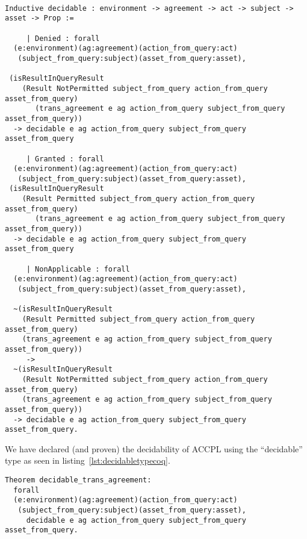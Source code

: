 \begin{lstlisting}

Inductive decidable : environment -> agreement -> act -> subject -> asset -> Prop :=

     | Denied : forall
  (e:environment)(ag:agreement)(action_from_query:act)
   (subject_from_query:subject)(asset_from_query:asset), 

 (isResultInQueryResult 
    (Result NotPermitted subject_from_query action_from_query asset_from_query)
       (trans_agreement e ag action_from_query subject_from_query asset_from_query)) 
  -> decidable e ag action_from_query subject_from_query asset_from_query

     | Granted : forall
  (e:environment)(ag:agreement)(action_from_query:act)
   (subject_from_query:subject)(asset_from_query:asset), 
 (isResultInQueryResult 
    (Result Permitted subject_from_query action_from_query asset_from_query)
       (trans_agreement e ag action_from_query subject_from_query asset_from_query)) 
  -> decidable e ag action_from_query subject_from_query asset_from_query

     | NonApplicable : forall
  (e:environment)(ag:agreement)(action_from_query:act)
   (subject_from_query:subject)(asset_from_query:asset), 

  ~(isResultInQueryResult 
    (Result Permitted subject_from_query action_from_query asset_from_query)
    (trans_agreement e ag action_from_query subject_from_query asset_from_query)) 
     ->
  ~(isResultInQueryResult 
    (Result NotPermitted subject_from_query action_from_query asset_from_query)
    (trans_agreement e ag action_from_query subject_from_query asset_from_query)) 
  -> decidable e ag action_from_query subject_from_query asset_from_query.
\end{lstlisting}


We have declared (and proven) the decidability of \ac{ACCPL} using the ``decidable'' type as seen in listing~\ref{lst:decidabletypecoq}.

\begin{lstlisting}
Theorem decidable_trans_agreement:
  forall
  (e:environment)(ag:agreement)(action_from_query:act)
   (subject_from_query:subject)(asset_from_query:asset),
     decidable e ag action_from_query subject_from_query asset_from_query.


\end{lstlisting}

